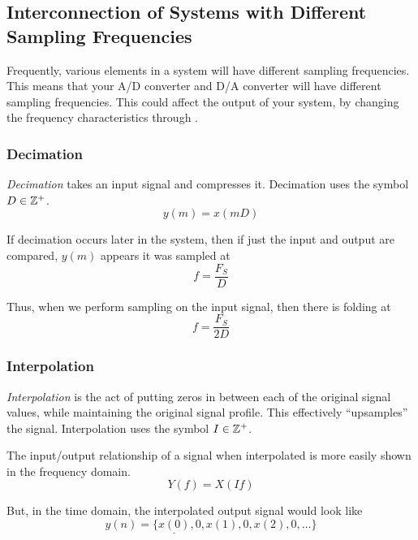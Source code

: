 \subsection{Interconnection of Systems with Different Sampling Frequencies}\label{subsec:Interconnect_Different_Sampling_Frequency}
Frequently, various elements in a system will have different sampling frequencies.
This means that your A/D converter and D/A converter will have different sampling frequencies.
This could affect the output of your system, by changing the frequency characteristics through .

\subsubsection{Decimation}\label{subsubsec:Decimation}
\begin{definition}[Decimation]\label{def:Decimation}
  \emph{Decimation} takes an input signal and compresses it.
  Decimation uses the symbol $D \in \operatorname{\mathbb{Z}^{+}}$.
  \begin{equation*}
    y(m) = x(mD)
  \end{equation*}

  If decimation occurs later in the system, then if just the input and output are compared, $y(m)$ appears it was sampled at
  \begin{equation}\label{eq:Input_Output_Decimation}
    f = \frac{F_{S}}{D}
  \end{equation}
  
  Thus, when we perform sampling on the input signal, then there is folding at
  \begin{equation}\label{eq:Decimation_Sampling_Frequency_Change}
    f = \frac{F_{S}}{2D}
  \end{equation}
\end{definition}

\subsubsection{Interpolation}\label{subsubsec:Interpolation}
\begin{definition}[Interpolation]\label{def:Interpolation}
  \emph{Interpolation} is the act of putting zeros in between each of the original signal values, while maintaining the original signal profile.
  This effectively ``upsamples'' the signal.
  Interpolation uses the symbol $I \in \operatorname{\mathbb{Z}^{+}}$.

  The input/output relationship of a signal when interpolated is more easily shown in the frequency domain.
  \begin{equation}\label{eq:Interpolation}
    Y(f) = X(If)
  \end{equation}

  But, in the time domain, the interpolated output signal would look like
  \begin{equation*}
    y(n) = \lbrace \underline{x(0)}, 0, x(1), 0, x(2), 0, \ldots \rbrace
  \end{equation*}
\end{definition}


